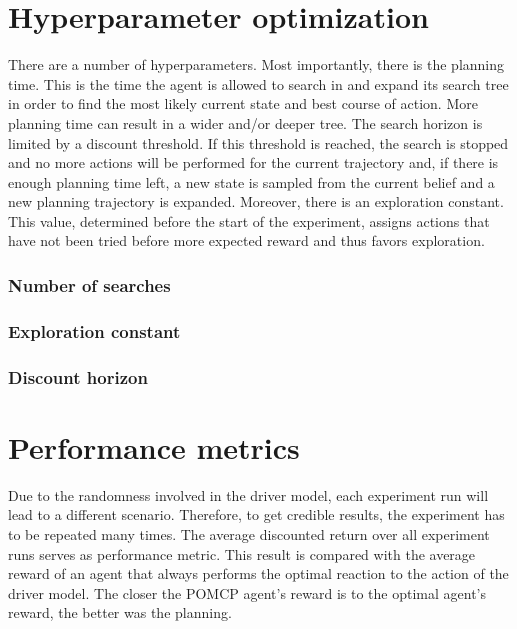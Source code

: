 \section{Hyperparameter optimization}


There are a number of hyperparameters. Most importantly, there is the planning time. This is the time the agent is allowed to search in and expand its search tree in order to find the most likely current state and best course of action. More planning time can result in a wider and/or deeper tree. The search horizon is limited by a discount threshold. If this threshold is reached, the search is stopped and no more actions will be performed for the current trajectory and, if there is enough planning time left, a new state is sampled from the current belief and a new planning trajectory is expanded. Moreover, there is an exploration constant. This value, determined before the start of the experiment, assigns actions that have not been tried before more expected reward and thus favors exploration.
\subsubsection{Number of searches}
\subsubsection{Exploration constant}
\subsubsection{Discount horizon}

\section{Performance metrics}
Due to the randomness involved in the driver model, each experiment run will lead to a different scenario. Therefore, to get credible results, the experiment has to be repeated many times. The average discounted return over all experiment runs serves as performance metric. This result is compared with the average reward of an agent that always performs the optimal reaction to the action of the driver model. The closer the POMCP agent's reward is to the optimal agent's reward, the better was the planning.

